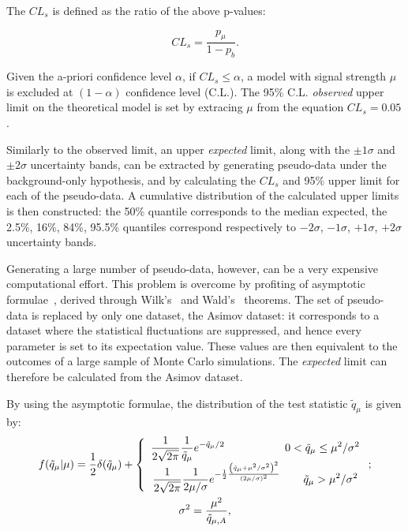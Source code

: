 \noindent The $CL_s$ is defined as the ratio of the above p-values:

\begin{equation}
CL_s = \frac{ p_{\mu} }{ 1 - p_b}.
\end{equation}

\noindent Given the a-priori confidence level $\alpha$, if $CL_s \leq \alpha$, a model with signal strength $\mu$ is excluded at $(1 - \alpha)$ confidence level (C.L.). The 95\% C.L. \emph{observed} upper limit on the theoretical model is set by extracing $\mu$ from the equation $CL_s = 0.05$.

\noindent Similarly to the observed limit, an upper \emph{expected} limit, along with the $\pm 1 \sigma$ and $\pm 2 \sigma$ uncertainty bands, can be extracted by generating pseudo-data under the background-only hypothesis, and by calculating the $CL_s$ and 95\% upper limit for each of the pseudo-data. A cumulative distribution of the calculated upper limits is then constructed: the 50\% quantile corresponds to the median expected, the 2.5\%, 16\%, 84\%, 95.5\% quantiles correspond respectively to $-2 \sigma$, $-1 \sigma$, $+1 \sigma$, $+2 \sigma$ uncertainty bands.

\noindent Generating a large number of pseudo-data, however, can be a very expensive computational effort. This problem is overcome by profiting of asymptotic formulae~\cite{bib:Asymptotic}, derived through Wilk's~\cite{bib:Wilks} and Wald's~\cite{10.2307/1990256} theorems. The set of pseudo-data is replaced by only one dataset, the Asimov dataset: it corresponds to a dataset where the statistical fluctuations are suppressed, and hence every parameter is set to its expectation value. These values are then equivalent to the outcomes of a large sample of Monte Carlo simulations. The \emph{expected} limit can therefore be calculated from the Asimov dataset.

\noindent By using the asymptotic formulae, the distribution of the test statistic $\tilde{q}_{\mu}$ is given by:
\begin{equation}
\begin{gathered}
f(\tilde{q}_{\mu}|\mu) = \frac{1}{2} \delta (\tilde{q}_{\mu}) + 
\left\{
\begin{array}{l}
\begin{gathered}
\frac{1}{2 \sqrt{2 \pi}} \frac{1}{\tilde{q}_{\mu}} e^{-\tilde{q}_{\mu}/2} \text{ \hspace*{1.8cm}} 0 < \tilde{q}_{\mu} \leq \mu^2 / \sigma^2\\
\frac{1}{2 \sqrt{2 \pi}} \frac{1}{2 \mu / \sigma} e^ {-\frac{1}{2} \frac{\left(\tilde{q}_{\mu}  + \mu^2 / \sigma^2 \right)^2}{\left( 2 \mu / \sigma \right)^2}  } \text{ \hspace*{0.5cm}  } \tilde{q}_{\mu} > \mu^2 / \sigma^2\\
\end{gathered}
\end{array}
\right. ; \\
\sigma^2 = \frac{\mu^2}{ \tilde{q}_{\mu, A}},
\end{gathered}
\end{equation}

